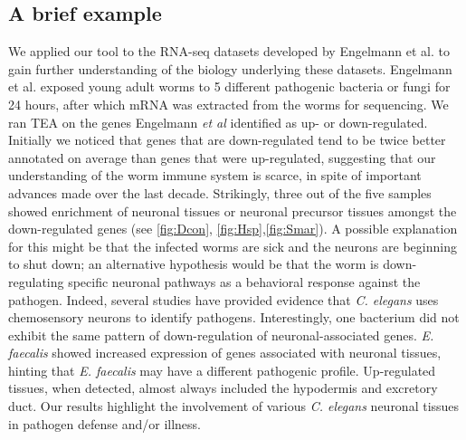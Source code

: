 \documentclass{bmcart}
\begin{document}
\subsection*{A brief example}
We applied our tool to the RNA-seq datasets developed by Engelmann et al.  \cite{Engelmann2011} to gain further understanding of the biology underlying these datasets. Engelmann et al.  exposed young adult worms to 5 different pathogenic bacteria or fungi for 24 hours, after which mRNA was extracted from the worms for sequencing. We ran TEA on the genes Engelmann \emph{et al} identified as up- or down-regulated. Initially we noticed that genes that are down-regulated tend to be twice better annotated on average than genes that were up-regulated, suggesting that our understanding of the worm immune system is scarce, in spite of important advances made over the last decade. Strikingly, three out of the five samples showed enrichment of neuronal tissues or neuronal precursor tissues amongst the down-regulated genes (see \ref{fig:Dcon}, \ref{fig:Hsp},\ref{fig:Smar}). A possible explanation for this might be that the infected worms are sick and the neurons are beginning to shut down; an alternative hypothesis would be that the worm is down-regulating specific neuronal pathways as a behavioral response against the pathogen. Indeed, several studies \cite{Meisel2014, Zhang2005} have provided evidence that   \emph{C. elegans} uses chemosensory neurons to identify pathogens. Interestingly, one bacterium did not exhibit the same pattern of down-regulation of neuronal-associated genes. \emph{E. faecalis} showed increased expression of genes associated with neuronal tissues, hinting that \emph{E. faecalis} may have a different pathogenic profile. Up-regulated tissues, when detected, almost always included the hypodermis and excretory duct.
	Our results highlight the involvement of various   \emph{C. elegans} neuronal tissues in pathogen defense and/or illness.
\end{document}

